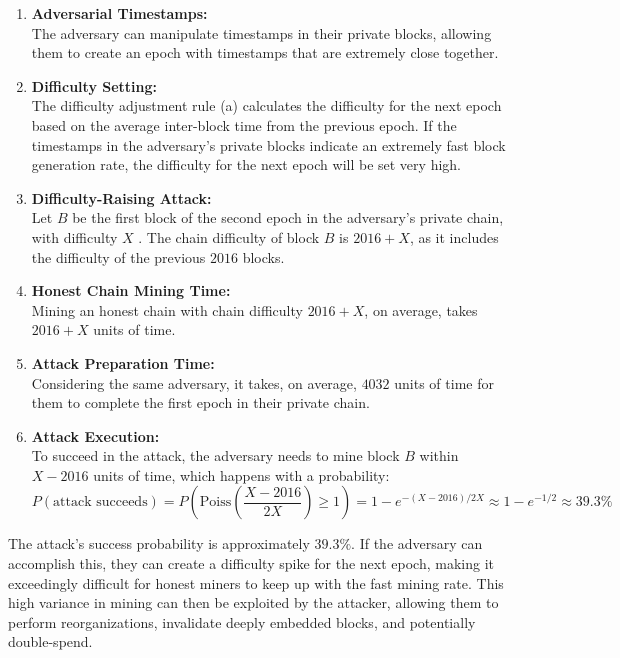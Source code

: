 \begin{enumerate}
    \item \textbf{Adversarial Timestamps:} \\The adversary can manipulate timestamps in their private blocks, allowing them to create an epoch with timestamps that are extremely close together.
    \item \textbf{Difficulty Setting:}\\The difficulty adjustment rule (a) calculates the difficulty for the next epoch based on the average inter-block time from the previous epoch. If the timestamps in the adversary's private blocks indicate an extremely fast block generation rate, the difficulty for the next epoch will be set very high.
    \item \textbf{Difficulty-Raising Attack:}\\Let $B$ be the first block of the second epoch in the adversary's private chain, with difficulty $X$ . The chain difficulty of block $B$ is $2016 + X$, as it includes the difficulty of the previous $2016$ blocks.
    \item \textbf{Honest Chain Mining Time:}\\Mining an honest chain with chain difficulty $2016 + X$, on average, takes $2016 + X$ units of time.
    \item \textbf{Attack Preparation Time:}\\Considering the same adversary, it takes, on average, $4032$ units of time for them to complete the first epoch in their private chain.
    \item \textbf{Attack Execution:}\\To succeed in the attack, the adversary needs to mine block $B$ within $X − 2016$ units of time, which happens with a probability:\begin{equation*}
        P(\text{attack succeeds}) = P(\text{Poiss}\left(\frac{X-2016}{2X}\right) \geq 1) = 1 - e^{-(X-2016)/2X} \approx 1 - e^{-1/2} \approx 39.3\%
    \end{equation*}
    
\end{enumerate}
The attack's success probability is approximately $39.3\%$. If the adversary can accomplish this, they can create a difficulty spike for the next epoch, making it exceedingly difficult for honest miners to keep up with the fast mining rate. This high variance in mining can then be exploited by the attacker, allowing them to perform reorganizations, invalidate deeply embedded blocks, and potentially double-spend.\\\\
